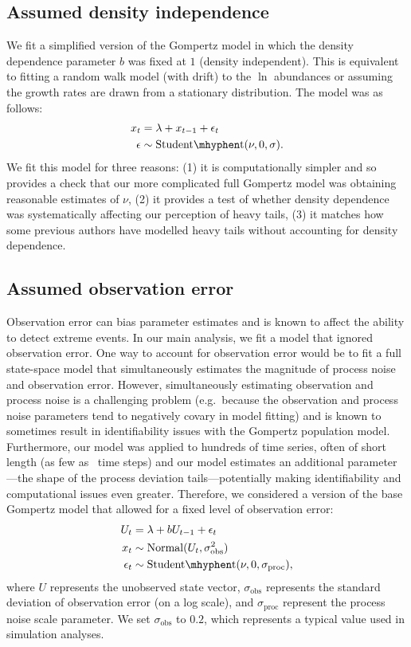\documentclass[12pt]{article}
\begin{document}
\subsection{Assumed density independence} We fit a simplified version of the Gompertz model in which the density dependence parameter \(b\) was fixed at \(1\) (density independent). This is equivalent to fitting a random walk model (with drift) to the \(\ln\) abundances or assuming the growth rates are drawn from a stationary distribution. The model was as follows:
\begin{align}
x_t &= \lambda + x_{t-1} + \epsilon_t\\
\epsilon &\sim \mathrm{Student\mhyphen t}(\nu, 0, \sigma).
\end{align}
We fit this model for three reasons: (1) it is computationally simpler and so provides a check that our more complicated full Gompertz model was obtaining reasonable estimates of \(\nu\), (2) it provides a test of whether density dependence was systematically affecting our perception of heavy tails, (3) it matches how some previous authors have modelled heavy tails without accounting for density dependence\cite{segura2013}.

\subsection{Assumed observation error} Observation error can bias parameter estimates\cite{knape2012} and is known to affect the ability to detect extreme events\cite{ward2007}. In our main analysis, we fit a model that ignored observation error. One way to account for observation error would be to fit a full state-space model that simultaneously estimates the magnitude of process noise and observation error. However, simultaneously estimating observation and process noise is a challenging problem (e.g.\ because the observation and process noise parameters tend to negatively covary in model fitting) and is known to sometimes result in identifiability issues with the Gompertz population model\cite{knape2008}. Furthermore, our model was applied to hundreds of time series, often of short length (as few as \minTimeSteps\ time steps) and our model estimates an additional parameter---the shape of the process deviation tails---potentially making identifiability and computational issues even greater. Therefore, we considered a version of the base Gompertz model that allowed for a fixed level of observation error:
\begin{align}
U_t &= \lambda + b U_{t-1} + \epsilon_t\\
x_t &\sim \mathrm{Normal}(U_t, \sigma_\mathrm{obs}^2)\\
\epsilon_t &\sim \mathrm{Student\mhyphen t}(\nu, 0, \sigma_\mathrm{proc}),
\end{align}
where \(U\) represents the unobserved state vector, \(\sigma_\mathrm{obs}\) represents the standard deviation of observation error (on a log scale), and \(\sigma_\mathrm{proc}\) represent the process noise scale parameter. We set \(\sigma_\mathrm{obs}\) to \(0.2\), which represents a typical value used in simulation analyses\cite{valpine2002, thorson2014b}.
\end{document}

